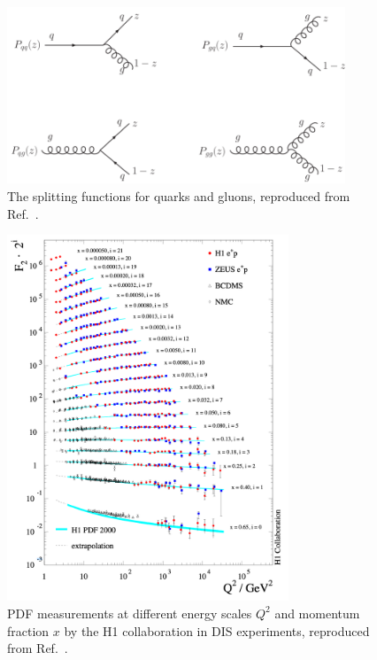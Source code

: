 \begin{figure}[ht]
	\centering
	\includegraphics[width=0.9\textwidth]{figures/01-SM-03-SM/qcd/The-splitting-functions.png}
	\caption{The splitting functions for quarks and gluons, reproduced from Ref.~\cite{Kollar:2007TopQuark}.}
	\label{fig:01_sm_qcd_splitting}
\end{figure}

\begin{figure}[ht!]
	\centering
	\includegraphics[width=0.75\textwidth]{figures/01-SM-03-SM/qcd/HERA_DIS.png}
	\caption{PDF measurements at different energy scales $Q^2$ and momentum fraction $x$ by the H1 collaboration in DIS experiments, reproduced from Ref.~\cite{Glazov:2007zz}.}
	\label{fig:01_sm_qcd_dglap}
\end{figure}


